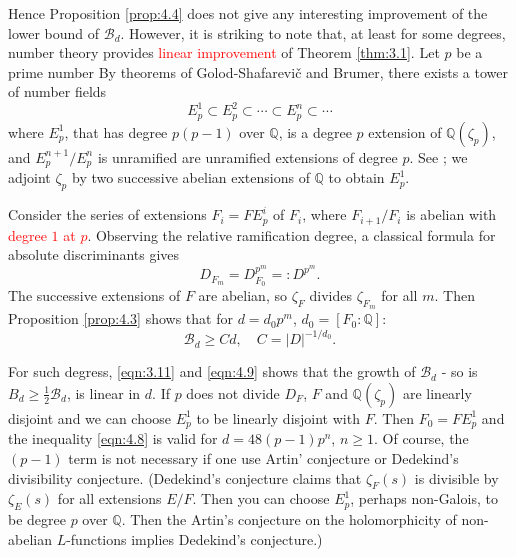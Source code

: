 Hence Proposition \ref{prop:4.4} does not give any interesting improvement of the lower bound of $\mathcal{B}_{d}$.
However, it is striking to note that, at least for some degrees, number theory provides \textcolor{red}{linear improvement} of Theorem \ref{thm:3.1}.
Let $p$ be a prime number
By theorems of Golod-Shafarevi\v{c} and Brumer, there exists a tower of number fields
\[
    E_p^1 \subset E_p^2 \subset \cdots \subset E_p^n \subset \cdots
\]
where $E_p^1$, that has degree $p(p-1)$ over $\mathbb{Q}$, is a degree $p$ extension of $\mathbb{Q}(\zeta_p)$, and $E_{p}^{n+1} / E_{p}^{n}$ is unramified are unramified extensions of degree $p$.
See \cite[Cor 7]{towers1967peter}; we adjoint $\zeta_p$ by two successive abelian extensions of $\mathbb{Q}$ to obtain $E_p^1$.

Consider the series of extensions $F_i = F E_p^i$ of $F_i$, where $F_{i+1}/F_{i}$ is abelian with \textcolor{red}{degree $1$ at $p$}.
Observing the relative ramification degree, a classical formula for absolute discriminants gives
\begin{equation}
    \label{eqn:4.8}
    D_{F_m} = D_{F_0}^{p^m} =: D^{p^m}.
\end{equation}
The successive extensions of $F$ are abelian, so $\zeta_F$ divides $\zeta_{F_m}$ for all $m$.
Then Proposition \ref{prop:4.3} shows that for $d = d_0 p^m$, $d_0 = [F_0:\mathbb{Q}]$:
\begin{equation}
    \label{eqn:4.9}
    \mathcal{B}_d \geq C d, \quad C = |D|^{-1/d_0}.
\end{equation}

For such degress, \eqref{eqn:3.11} and \eqref{eqn:4.9} shows that the growth of $\mathcal{B}_d$ - so is $B_d \geq \frac{1}{2}\mathcal{B}_d$, is linear in $d$.
If $p$ does not divide $D_F$, $F$ and $\mathbb{Q}(\zeta_p)$ are linearly disjoint and we can choose $E_p^1$ to be linearly disjoint with $F$.
Then $F_0 = F E_p^1$ and the inequality \eqref{eqn:4.8} is valid for $d = 48(p-1)p^n$, $n \geq 1$.
Of course, the $(p-1)$ term is not necessary if one use Artin' conjecture or Dedekind's divisibility conjecture. (Dedekind's conjecture claims that $\zeta_F(s)$ is divisible by $\zeta_E(s)$ for all extensions $E/F$. Then you can choose $E_p^1$, perhaps non-Galois, to be degree $p$ over $\mathbb{Q}$.
Then the Artin's conjecture on the holomorphicity of non-abelian $L$-functions implies Dedekind's conjecture.)


